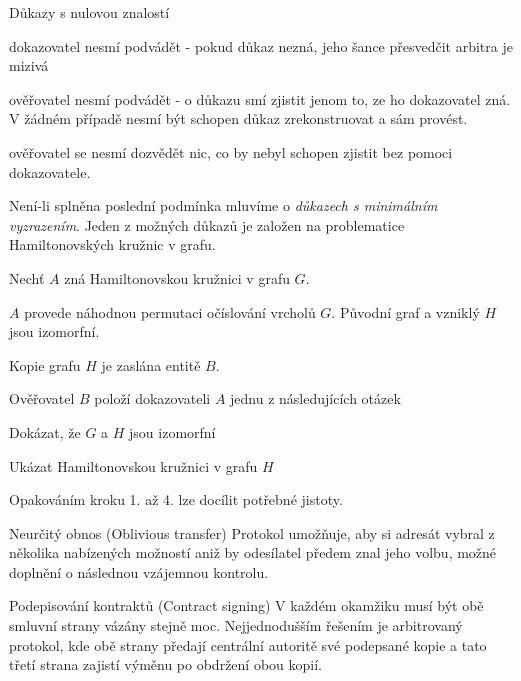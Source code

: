 \begin{obecne}{Důkazy s nulovou znalostí}
  \begin{pitemize}
    \item dokazovatel nesmí podvádět - pokud důkaz nezná, jeho šance přesvedčit arbitra
    je mizivá
    \item ověřovatel nesmí podvádět - o důkazu smí zjistit jenom to, ze ho dokazovatel zná.
    V žádném případě nesmí být schopen důkaz zrekonstruovat a sám provést.
    \item ověřovatel se nesmí dozvědět nic, co by nebyl schopen zjistit bez pomoci 
    dokazovatele.
  \end{pitemize}
  Není-li splněna poslední podmínka mluvíme o \emph{důkazech s minimálním vyzrazením}.
  Jeden z možných důkazů je založen na problematice Hamiltonovských kružnic v grafu.
  \begin{penumerate}
    \item Nechť $A$ zná Hamiltonovskou kružnici v grafu $G$.
    \item $A$ provede náhodnou permutaci očíslování vrcholů $G$. Původní graf a vzniklý $H$ jsou izomorfní.
    \item Kopie grafu $H$ je zaslána entitě $B$.
    \item Ověřovatel $B$ položí dokazovateli $A$ jednu z následujících otázek
    \begin{penumerate}
	\item Dokázat, že $G$ a $H$ jsou izomorfní
	\item Ukázat Hamiltonovskou kružnici v grafu $H$
    \end{penumerate}
    \item Opakováním kroku 1. až 4. lze docílit potřebné jistoty. 
  \end{penumerate}
\end{obecne}

\begin{obecne}{Neurčitý obnos (Oblivious transfer)}
  Protokol umožňuje, aby si adresát vybral z několika nabízených možností aniž
  by odesílatel předem znal jeho volbu, možné doplnění o následnou vzájemnou
  kontrolu.
\end{obecne}

\begin{obecne}{Podepisování kontraktů (Contract signing)}
  V každém okamžiku musí být obě smluvní strany vázány stejně moc.
  Nejjednodušším řešením je arbitrovaný protokol, kde obě strany předají
  centrální autoritě své podepsané kopie a tato třetí strana zajistí výměnu po
  obdržení obou kopií.
\end{obecne}

